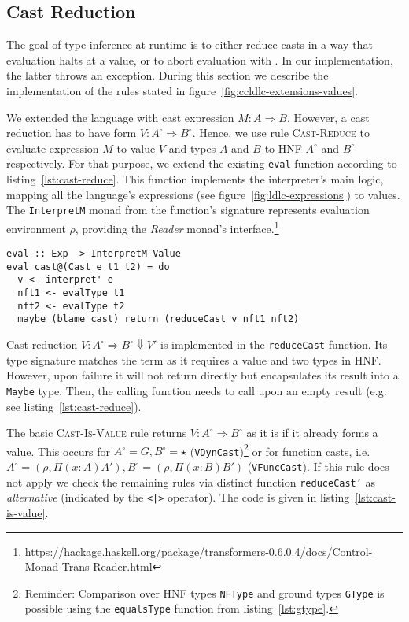 \subsection{Cast Reduction}

The goal of type inference at runtime is to either reduce casts in a way that evaluation halts at a value, or to abort evaluation with \blame. In our implementation, the latter throws an exception. During this section we describe the implementation of the rules stated in figure~\ref{fig:ccldlc-extensions-values}.

We extended the language with cast expression $M : A \Rightarrow B$. However, a cast reduction has to have form $V : A^\circ \Rightarrow B^\circ$. Hence, we use rule \textsc{Cast-Reduce} to evaluate expression $M$ to value $V$ and types $A$ and $B$ to HNF $A^\circ$ and $B^\circ$ respectively. For that purpose, we extend the existing \texttt{eval} function according to listing~\ref{lst:cast-reduce}. This function implements the interpreter's main logic, mapping all the language's expressions (see figure~\ref{fig:ldlc-expressions}) to values. The \texttt{InterpretM} monad from the function's signature represents evaluation environment $\rho$, providing the \emph{Reader} monad's interface.\footnote{\url{https://hackage.haskell.org/package/transformers-0.6.0.4/docs/Control-Monad-Trans-Reader.html}}

\begin{lstlisting}[float,
  caption=Cast expression evaluation (\texttt{Interpreter.hs}),
  label=lst:cast-reduce]
eval :: Exp -> InterpretM Value
eval cast@(Cast e t1 t2) = do
  v <- interpret' e
  nft1 <- evalType t1
  nft2 <- evalType t2
  maybe (blame cast) return (reduceCast v nft1 nft2)
\end{lstlisting}

Cast reduction $V : A^\circ \Rightarrow B^\circ \Downarrow V'$ is implemented in the \texttt{reduceCast} function. Its type signature matches the term as it requires a value and two types in HNF. However, upon failure it will not return \blame directly but encapsulates its result into a \texttt{Maybe} type. Then, the calling function needs to call \blame upon an empty result (e.g. see listing~\ref{lst:cast-reduce}).

The basic \textsc{Cast-Is-Value} rule returns $V : A^\circ \Rightarrow B^\circ$ as it is if it already forms a value. This occurs for $A^\circ = G, B^\circ = \star$ (\texttt{VDynCast})\footnote{Reminder: Comparison over HNF types \texttt{NFType} and ground types \texttt{GType} is possible using the \texttt{equalsType} function from listing~\ref{lst:gtype}.} or for function casts, i.e. $A^\circ=(\rho, \Pi(x:A)A'), B^\circ=(\rho, \Pi(x:B)B')$ (\texttt{VFuncCast}). If this rule does not apply we check the remaining rules via distinct function \texttt{reduceCast'} as \emph{alternative} (indicated by the \texttt{<|>} operator). The code is given in listing~\ref{lst:cast-is-value}.

